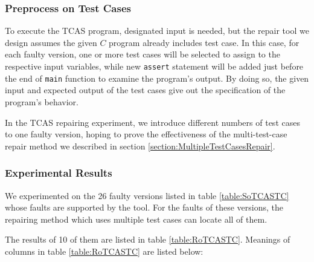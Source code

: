 \subsubsection{Preprocess on Test Cases}
To execute the TCAS program, designated input is needed, but the repair tool we design assumes the given $C$ program already includes test case.
In this case, for each faulty version, one or more test cases will be selected to assign to the respective input variables, while new \lstinline|assert| statement will be added just before the end of \lstinline|main| function
to examine the program's output.
By doing so, the given input and expected output of the test cases give out the specification of the program's behavior.

In the TCAS repairing experiment, we introduce different numbers of test cases to one faulty version, hoping to prove the effectiveness of the multi-test-case repair method we described in section \ref{section:MultipleTestCasesRepair}.

\subsubsection{Experimental Results}
We experimented on the 26 faulty versions listed in table \ref{table:SoTCASTC} whose faults are supported by the tool.
For the faults of these versions, the repairing method which uses multiple test cases can locate all of them.

The results of 10 of them are listed in table \ref{table:RoTCASTC}. Meanings of columns in table \ref{table:RoTCASTC} are listed below:

